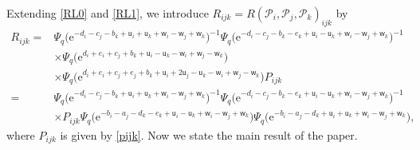 \documentclass[11pt]{article}
\numberwithin{equation}{section}
\newcommand{\e}{{\mathrm e}}
\newcommand{\uu}{{\mathsf u}}
\newcommand{\ww}{{\mathsf w}}
\numberwithin{equation}{section}
\begin{document}
Extending \eqref{RL0} and \eqref{RL1}, we introduce
$R_{ijk}=R(\mathscr{P}_i ,\mathscr{P}_j ,\mathscr{P}_k)_{ijk}$
by
\begin{align}
R_{ijk}
={}&
\Psi_q\bigl(\e^{-d_i-c_j-b_k+\uu_i+\uu_k+\ww_i-\ww_j+\ww_k}\bigr)^{-1}
\Psi_q\bigl(\e^{-d_i-c_j-b_k-e_k+\uu_i-\uu_k+\ww_i-\ww_j+\ww_k}\bigr)^{-1}
\nonumber \\
& \times
\Psi_q\bigl(\e^{d_i+e_i+c_j+b_k+\uu_i-\uu_k-\ww_i+\ww_j-\ww_k}\bigr)\nonumber \\
& \times
\Psi_q\bigl(\e^{d_i+e_i+c_j+e_j+b_k+\uu_i+2\uu_j-\uu_k-\ww_i+\ww_j-\ww_k}\bigr)P_{ijk}
\label{rijk0}\\
={}&
\Psi_q\bigl(\e^{-d_i-c_j-b_k+\uu_i+\uu_k+\ww_i-\ww_j+\ww_k}\bigr)^{-1}
\Psi_q\bigl(\e^{-d_i-c_j-b_k-e_k+\uu_i-\uu_k+\ww_i-\ww_j+\ww_k}\bigr)^{-1}
\nonumber\\
& \times P_{ijk}
\Psi_q\bigl(\e^{-b_i-a_j-d_k-e_k+\uu_i-\uu_k+\ww_i-\ww_j+\ww_k}\bigr)
\Psi_q\bigl(\e^{-b_i-a_j-d_k+\uu_i+\uu_k+\ww_i-\ww_j+\ww_k}\bigr),
\label{rijk}
\end{align}
where $P_{ijk}$ is given by \eqref{pijk}.
Now we state the main result of the paper.
\end{document}
